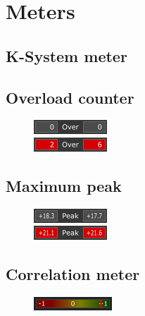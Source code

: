 \section{Meters}

\subsection{K-System meter}



\subsection{Overload counter}

\begin{figure}[H]
  \centering{}
  \includegraphics[scale=\screenshotscale,clip]{include/images/overload_counter_normal.png} \\
  \includegraphics[scale=\screenshotscale,clip]{include/images/overload_counter_clipped.png}
\end{figure}

\subsection{Maximum peak}

\begin{figure}[H]
  \centering{}
  \includegraphics[scale=\screenshotscale,clip]{include/images/maximum_peak_normal.png} \\
  \includegraphics[scale=\screenshotscale,clip]{include/images/maximum_peak_clipped.png}
\end{figure}

\subsection{Correlation meter}

\begin{figure}[H]
  \centering{}
  \includegraphics[scale=\screenshotscale,clip]{include/images/correlation_meter.png}
\end{figure}

